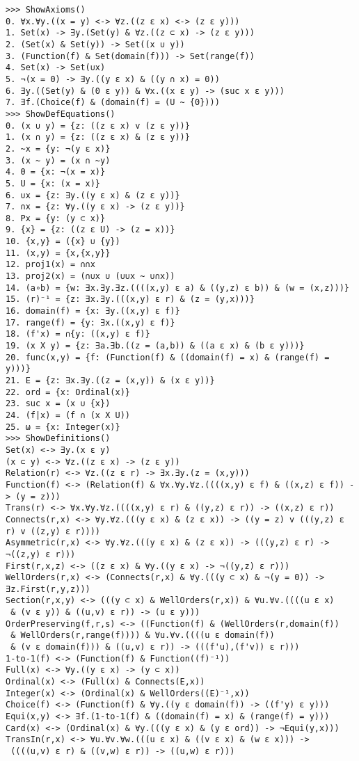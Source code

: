 \documentclass[a4paper,12pt,leqno]{article}
\numberwithin{equation}{section}
\begin{document}
\begin{verbatim}
>>> ShowAxioms()
0. ∀x.∀y.((x = y) <-> ∀z.((z ε x) <-> (z ε y))) 
1. Set(x) -> ∃y.(Set(y) & ∀z.((z ⊂ x) -> (z ε y))) 
2. (Set(x) & Set(y)) -> Set((x ∪ y)) 
3. (Function(f) & Set(domain(f))) -> Set(range(f)) 
4. Set(x) -> Set(∪x) 
5. ¬(x = 0) -> ∃y.((y ε x) & ((y ∩ x) = 0)) 
6. ∃y.((Set(y) & (0 ε y)) & ∀x.((x ε y) -> (suc x ε y))) 
7. ∃f.(Choice(f) & (domain(f) = (U ~ {0}))) 
>>> ShowDefEquations()
0. (x ∪ y) = {z: ((z ε x) v (z ε y))} 
1. (x ∩ y) = {z: ((z ε x) & (z ε y))} 
2. ~x = {y: ¬(y ε x)} 
3. (x ~ y) = (x ∩ ~y) 
4. 0 = {x: ¬(x = x)} 
5. U = {x: (x = x)} 
6. ∪x = {z: ∃y.((y ε x) & (z ε y))} 
7. ∩x = {z: ∀y.((y ε x) -> (z ε y))} 
8. Px = {y: (y ⊂ x)} 
9. {x} = {z: ((z ε U) -> (z = x))} 
10. {x,y} = ({x} ∪ {y}) 
11. (x,y) = {x,{x,y}} 
12. proj1(x) = ∩∩x 
13. proj2(x) = (∩∪x ∪ (∪∪x ~ ∪∩x)) 
14. (a∘b) = {w: ∃x.∃y.∃z.((((x,y) ε a) & ((y,z) ε b)) & (w = (x,z)))} 
15. (r)⁻¹ = {z: ∃x.∃y.(((x,y) ε r) & (z = (y,x)))} 
16. domain(f) = {x: ∃y.((x,y) ε f)} 
17. range(f) = {y: ∃x.((x,y) ε f)} 
18. (f'x) = ∩{y: ((x,y) ε f)} 
19. (x X y) = {z: ∃a.∃b.((z = (a,b)) & ((a ε x) & (b ε y)))} 
20. func(x,y) = {f: (Function(f) & ((domain(f) = x) & (range(f) = y)))} 
21. E = {z: ∃x.∃y.((z = (x,y)) & (x ε y))} 
22. ord = {x: Ordinal(x)} 
23. suc x = (x ∪ {x}) 
24. (f|x) = (f ∩ (x X U)) 
25. ω = {x: Integer(x)} 
>>> ShowDefinitions()
Set(x) <-> ∃y.(x ε y)
(x ⊂ y) <-> ∀z.((z ε x) -> (z ε y))
Relation(r) <-> ∀z.((z ε r) -> ∃x.∃y.(z = (x,y)))
Function(f) <-> (Relation(f) & ∀x.∀y.∀z.((((x,y) ε f) & ((x,z) ε f)) -> (y = z)))
Trans(r) <-> ∀x.∀y.∀z.((((x,y) ε r) & ((y,z) ε r)) -> ((x,z) ε r))
Connects(r,x) <-> ∀y.∀z.(((y ε x) & (z ε x)) -> ((y = z) v (((y,z) ε r) v ((z,y) ε r))))
Asymmetric(r,x) <-> ∀y.∀z.(((y ε x) & (z ε x)) -> (((y,z) ε r) -> ¬((z,y) ε r)))
First(r,x,z) <-> ((z ε x) & ∀y.((y ε x) -> ¬((y,z) ε r)))
WellOrders(r,x) <-> (Connects(r,x) & ∀y.(((y ⊂ x) & ¬(y = 0)) -> ∃z.First(r,y,z)))
Section(r,x,y) <-> (((y ⊂ x) & WellOrders(r,x)) & ∀u.∀v.((((u ε x)
 & (v ε y)) & ((u,v) ε r)) -> (u ε y)))
OrderPreserving(f,r,s) <-> ((Function(f) & (WellOrders(r,domain(f))
 & WellOrders(r,range(f)))) & ∀u.∀v.((((u ε domain(f)) 
 & (v ε domain(f))) & ((u,v) ε r)) -> (((f'u),(f'v)) ε r)))
1-to-1(f) <-> (Function(f) & Function((f)⁻¹))
Full(x) <-> ∀y.((y ε x) -> (y ⊂ x))
Ordinal(x) <-> (Full(x) & Connects(E,x))
Integer(x) <-> (Ordinal(x) & WellOrders((E)⁻¹,x))
Choice(f) <-> (Function(f) & ∀y.((y ε domain(f)) -> ((f'y) ε y)))
Equi(x,y) <-> ∃f.(1-to-1(f) & ((domain(f) = x) & (range(f) = y)))
Card(x) <-> (Ordinal(x) & ∀y.(((y ε x) & (y ε ord)) -> ¬Equi(y,x)))
TransIn(r,x) <-> ∀u.∀v.∀w.(((u ε x) & ((v ε x) & (w ε x))) ->
 ((((u,v) ε r) & ((v,w) ε r)) -> ((u,w) ε r)))
\end{verbatim}
\end{document}
